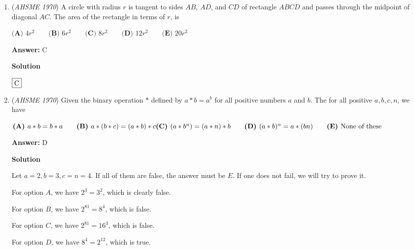 \begin{enumerate}
\textbf{Solution}

From the Remainder Theorem, we have $2(-2)^3 - h(-2) + k = 0$ and $2(1)^3 - h(1) + k = 0$.  Simplifying both of those equations gives $-16 + 2h + k = 0$ and $2 - h + k = 0$.  Since $k = 16 - 2h$ and $k = h - 2$, we set those equal to get:

 $16 - 2h = h - 2$
$3h = 18$
$h = 6$

 This gives $k = 4$ when substituting back into either of the two equations, and $|2h - 3k| = 0$, which is answer $\fbox{E}$.

 


	\item (\textit{AHSME 1970}) A circle with radius $r$ is tangent to sides $AB$, $AD$, and $CD$ of rectangle $ABCD$ and passes through
the midpoint of diagonal $AC$. The area of the rectangle in terms of $r$, is


 $\textbf{(A) }4r^2\qquad \textbf{(B) }6r^2\qquad \textbf{(C) }8r^2\qquad \textbf{(D) }12r^2\qquad  \textbf{(E) }20r^2$

 \textbf{Answer: }C



\textbf{Solution}

$\fbox{C}$



	\item (\textit{AHSME 1970}) Given the binary operation $\ast$ defined by $a\ast b=a^b$ for all positive numbers $a$ and $b$. The for all positive $a,b,c,n$, we have


 $\textbf{(A) }a\ast b=b\ast a\qquad \textbf{(B) }a\ast (b\ast c)=(a\ast b)\ast c\qquad\\ \textbf{(C) }(a\ast b^n)=(a\ast n)\ast b\qquad \textbf{(D) }(a\ast b)^n=a\ast (bn)\qquad  \textbf{(E) }\text{None of these}$

 \textbf{Answer: }D



\textbf{Solution}

Let $a = 2, b = 3, c=n = 4$.  If all of them are false, the answer must be $E$.  If one does not fail, we will try to prove it.

 For option $A$, we have $2^3 = 3^2$, which is clearly false.

 For option $B$, we have $2^{81} = 8^{4}$, which is false.

 For option $C$, we have $2^{81} = 16^3$, which is false.

 For option $D$, we have $8^4 = 2^{12}$, which is true.


\end{enumerate}
